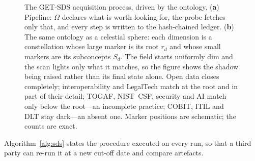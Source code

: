 \documentclass[engproc,proceedingpaper,submit,moreauthors]{Definitions/mdpi}
\begin{document}
\begin{figure}[H]
\caption{The GET-SDS acquisition process, driven by the ontology. (\textbf{a}) Pipeline: $\Omega$ declares what is worth looking for, the probe fetches only that, and every step is written to the hash-chained ledger. (\textbf{b}) The same ontology as a celestial sphere: each dimension is a constellation whose large marker is its root $r_d$ and whose small markers are its subconcepts $S_d$. The field starts uniformly dim and the scan lights only what it matches, so the figure shows the shadow being raised rather than its final state alone. Open data closes completely; interoperability and LegalTech match at the root and in part of their detail; TOGAF, NIST~CSF, security and AI match only below the root---an incomplete practice; COBIT, ITIL and DLT stay dark---an absent one. Marker positions are schematic; the counts are exact.\label{fig:getsds}}
\end{figure}

    Algorithm~\ref{alg:sds} states the procedure executed on every run, so that a third party can re-run it at a new cut-off date and compare artefacts.
\end{document}
